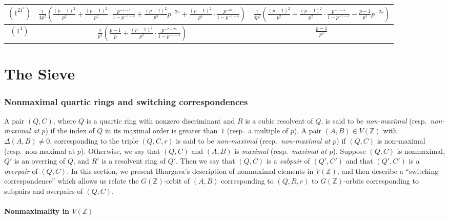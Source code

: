 \documentclass{article}
\def\Z{{\mathbb Z}}
\def\Z{{\mathbb Z}}
\begin{document}
{\begin{tabular}{|c|c|c|}
   \hline
    $(1^21^2)$& $\frac{1}{4p^2}\left(\frac{(p-1)^2}{p^2} + \frac{(p-1)^2}{p^2}\cdot \frac{p^{-1-s}}{1-p^{-1-s}} + \frac{(p-1)^2}{p^3}p^{-2s}+ \frac{(p-1)^2}{p^4}\cdot\frac{p^{-3s}}{1-p^{-1-s}}\right)$&$\frac{1}{4p^2}\left(\frac{(p-1)^2}{p^2} + \frac{(p-1)^2}{p^2}\cdot \frac{p^{-1-s}}{1-p^{-1-s}} - \frac{p-1}{p^3}p^{-2s}\right)$ \\
   \hline
    $(1^4)$& $\frac{1}{p^3}\left(\frac{p-1}{p} + \frac{(p-1)^2}{p^2}\cdot \frac{p^{-2-2s}}{1-p^{-1-s}} \right)$&$\frac{p-1}{p^4}$ \\
   \hline
\end{tabular}
}

\part{The Sieve}

\section{Nonmaximal quartic rings and switching correspondences}\label{sec:switching}

A pair $(Q,C)$, where $Q$ is a quartic ring with nonzero discriminant and $R$ is a cubic resolvent of $Q$, is said to be {\it non-maximal} (resp.\ {\it non-maximal at $p$}) if the index of $Q$ in its maximal order is greater than~$1$ (resp.\ a multiple of $p$). A pair $(A,B)\in V(\Z)$ with $\Delta(A,B)\neq 0$, corresponding to the triple $(Q,C,r)$ is said to be {\it non-maximal} (resp.\ {\it non-maximal at $p$}) if $(Q,C)$ is non-maximal (resp.\ non-maximal at $p$). Otherwise, we say that $(Q,C)$ and $(A,B)$ is {\it maximal} (resp.\ {\it maximal at $p$}). Suppose $(Q,C)$ is nonmaximal, $Q'$ is an overring of $Q$, and $R'$ is a resolvent ring of $Q'$. Then we say that $(Q,C)$ is a {\it subpair} of $(Q',C')$ and that $(Q',C')$ is a {\it overpair} of $(Q,C)$.
In this section, we present Bhargava's description of nonmaximal elements in $V(\Z)$, and then describe a ``switching correspondence'' which allows us relate the $G(\Z)$-orbit of $(A,B)$ corresponding to $(Q,R,r)$ to $G(\Z)$-orbits corresponding to subpairs and overpairs of $(Q,C)$.



\subsection{Nonmaximality in $V(\Z)$}
\end{document}
